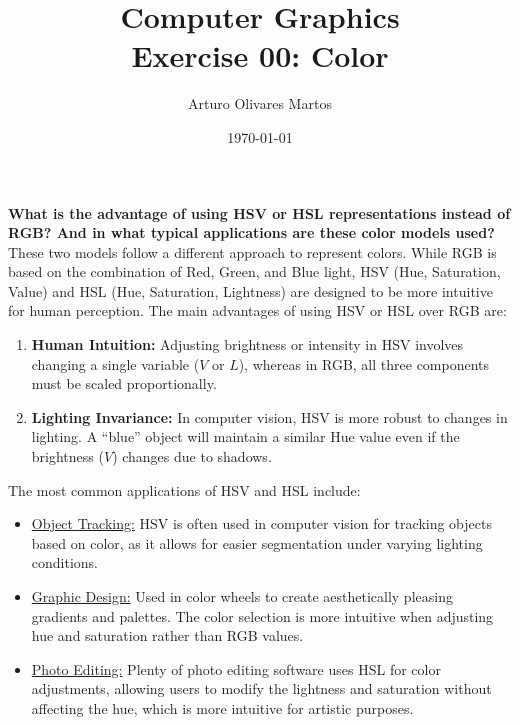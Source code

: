 \documentclass[12pt]{article}
\title{Computer Graphics\\Exercise 00: Color}
\author{Arturo Olivares Martos}
\date{\today}
\begin{document}
\maketitle

\textbf{What is the advantage of using HSV or HSL representations instead of RGB? And in what typical applications are these color models used?}\\

These two models follow a different approach to represent colors. While RGB is based on the combination of Red, Green, and Blue light, HSV (Hue, Saturation, Value) and HSL (Hue, Saturation, Lightness) are designed to be more intuitive for human perception. The main advantages of using HSV or HSL over RGB are:
\begin{enumerate}
    \item \textbf{Human Intuition:} Adjusting brightness or intensity in HSV involves changing a single variable ($V$ or $L$), whereas in RGB, all three components must be scaled proportionally.
    \item \textbf{Lighting Invariance:} In computer vision, HSV is more robust to changes in lighting. A ``blue'' object will maintain a similar Hue value even if the brightness ($V$) changes due to shadows.
\end{enumerate}

The most common applications of HSV and HSL include:
\begin{itemize}
    \item \underline{Object Tracking:} HSV is often used in computer vision for tracking objects based on color, as it allows for easier segmentation under varying lighting conditions.
    \item \underline{Graphic Design:} Used in color wheels to create aesthetically pleasing gradients and palettes. The color selection is more intuitive when adjusting hue and saturation rather than RGB values.
    \item \underline{Photo Editing:} Plenty of photo editing software uses HSL for color adjustments, allowing users to modify the lightness and saturation without affecting the hue, which is more intuitive for artistic purposes.
\end{itemize}
\end{document}
